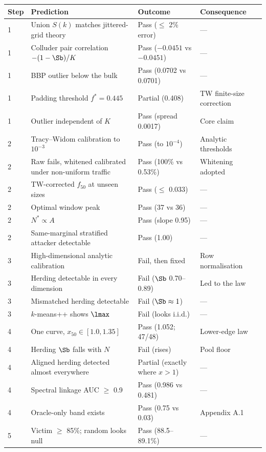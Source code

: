 \begin{longtable}{p{}p{}p{}p{}}
\toprule
Step & Prediction & Outcome & Consequence \\
\midrule
\endhead
1 & Union $S(k)$ matches jittered-grid theory & Pass ($\le$ 2\% error) & --- \\
1 & Colluder pair correlation $-(1-\Sb)/K$ & Pass ($-0.0451$ vs $-0.0451$) & --- \\
1 & BBP outlier below the bulk & Pass (0.0702 vs 0.0701) & --- \\
1 & Padding threshold $f^*=0.445$ & Partial (0.408) & TW finite-size correction \\
1 & Outlier independent of $K$ & Pass (spread 0.0017) & Core claim \\
2 & Tracy--Widom calibration to $10^{-3}$ & Pass (to $10^{-4}$) & Analytic thresholds \\
2 & Raw fails, whitened calibrated under non-uniform traffic & Pass (100\% vs 0.53\%) & Whitening adopted \\
2 & TW-corrected $f_{50}$ at unseen sizes & Pass ($\le$ 0.033) & --- \\
2 & Optimal window peak & Pass (37 vs 36) & --- \\
2 & $N^*\propto A$ & Pass (slope 0.95) & --- \\
2 & Same-marginal stratified attacker detectable & Pass (1.00) & --- \\
3 & High-dimensional analytic calibration & Fail, then fixed & Row normalisation \\
3 & Herding detectable in every dimension & Fail ($\Sb$ 0.70--0.89) & Led to the law \\
3 & Mismatched herding detectable & Fail ($\Sb\approx 1$) & --- \\
3 & $k$-means++ shows $\lmax$ & Fail (looks i.i.d.) & --- \\
4 & One curve, $x_{50}\in[1.0,1.35]$ & Pass (1.052; 47/48) & Lower-edge law \\
4 & Herding $\Sb$ falls with $N$ & Fail (rises) & Pool floor \\
4 & Aligned herding detected almost everywhere & Partial (exactly where $x>1$) & --- \\
4 & Spectral linkage AUC $\ge$ 0.9 & Pass (0.986 vs 0.481) & --- \\
4 & Oracle-only band exists & Pass (0.75 vs 0.03) & Appendix A.1 \\
5 & Victim $\ge$ 85\%; random looks null & Pass (88.5--89.1\%) & --- \\

\end{longtable}
